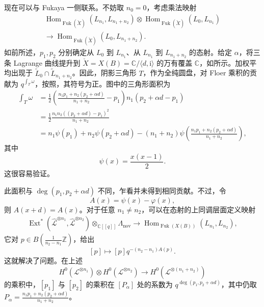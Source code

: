 现在可以与 Fukaya 一侧联系。不妨取 $n_0=0$，考虑乘法映射
\[
\begin{aligned}
\operatorname{Hom}_{\operatorname{Fuk}(\check X)}(L_{n_1},L_{n_1+n_2})
\otimes\operatorname{Hom}_{\operatorname{Fuk}(\check X)}(L_0,L_{n_1})\\
\longrightarrow\operatorname{Hom}_{\operatorname{Fuk}(\check X)}(L_0,L_{n_1+n_2}).
\end{aligned}
\]
如前所述，$p_1,p_2$ 分别确定从 $L_0$ 到 $L_{n_1}$、从 $L_{n_1}$ 到 $L_{n_1+n_2}$ 的态射。给定 $\alpha$，将三条 Lagrange 曲线提升到 $\check X=X(B)=\mathbb C/\langle d,\mathrm i\rangle$ 的万有覆盖 $\mathbb C$，如所示。加权平均出现于 $\widetilde L_0\cap\widetilde L_{n_1+n_2}$。因此，阴影三角形 $T$，作为全纯圆盘，对 Floer 乘积的贡献为 $q^{\int_T\omega}$，按照，其符号为正。图中的三角形面积为
\[
\begin{aligned}
\int_T\omega
&=\frac12\left(\frac{n_1p_1+n_2(p_2+\alpha d)}{n_1+n_2}-p_1\right)
n_1(p_2+\alpha d-p_1)\\
&=\frac12\frac{n_1n_2((p_2+\alpha d)-p_1)^2}{n_1+n_2}\\
&=n_1\psi(p_1)+n_2\psi(p_2+\alpha d)
-(n_1+n_2)\psi\left(\frac{n_1p_1+n_2(p_2+\alpha d)}{n_1+n_2}\right),
\end{aligned}
\]
其中
\begin{equation}\label{eq:8.17}
\psi(x)=\frac{x(x-1)}2.
\end{equation}
这很容易验证。
\begin{figure}[H]
\centering
{}
\BookNumberOnlyCaption\label{fig:8.29}
\end{figure}

此面积与 $\deg(p_1,p_2+\alpha d)$ 不同，乍看并未得到相同贡献。不过，令
\begin{equation}\label{eq:8.18}
A(x)=\psi(x)-\varphi(x),
\end{equation}
则 $A(x+d)=A(x)$。对于任意 $n_1\neq n_2$，可以在态射的上同调层面定义映射
\[
\begin{aligned}
\operatorname{Ext}^*(\widehat{\mathcal L}^{\otimes n_1},
\widehat{\mathcal L}^{\otimes n_2})\otimes_{\mathbb C[[q]]}\Lambda_{\mathrm{nov}}
\longrightarrow\operatorname{Hom}_{\operatorname{Fuk}(X(B))}(L_{n_1},L_{n_2}),
\end{aligned}
\]
它对 $p\in B(\tfrac1{n_2-n_1}\mathbb Z)$，给出
\begin{equation}\label{eq:8.19}
[p]\longmapsto[p]q^{-(n_2-n_1)A(p)}.
\end{equation}
这就解决了问题。在上述
\[
H^0(\mathcal L^{\otimes n_1})\otimes H^0(\mathcal L^{\otimes n_2})
\longrightarrow H^0(\mathcal L^{\otimes(n_1+n_2)})
\]
的乘积中，$[p_1]$ 与 $[p_2]$ 的乘积在 $[P_\alpha]$ 处的系数为 $q^{\deg(p_1,p_2+\alpha d)}$，其中仍取 $P_\alpha=\tfrac{n_1p_1+n_2(p_2+\alpha d)}{n_1+n_2}$。

